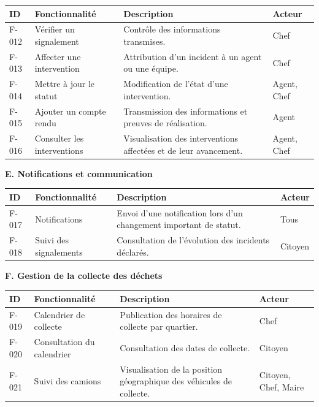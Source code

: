 \documentclass[11pt,a4paper,oneside]{report}
\begin{document}
	\begin{center}
		\begin{tabular}{|p{1.1cm}|p{3cm}|p{8cm}|p{1.7cm}|}
			\hline
			\textbf{ID} & \textbf{Fonctionnalité} &
			\textbf{Description} & \textbf{Acteur} \\ \hline
			F-012 & Vérifier un signalement & Contrôle des informations transmises. & Chef \\ \hline
			F-013 & Affecter une intervention & Attribution d'un incident à un agent ou une équipe. & Chef \\ \hline
			F-014 & Mettre à jour le statut & Modification de l'état d'une intervention. & Agent, Chef \\ \hline
			F-015 & Ajouter un compte rendu & Transmission des informations et preuves de réalisation. & Agent \\ \hline
			F-016 & Consulter les interventions & Visualisation des interventions affectées et de leur avancement. & Agent, Chef \\ \hline
		\end{tabular}
	\end{center}
	
	\noindent\textbf{E. Notifications et communication}
	
	\begin{center}
		\begin{tabular}{|p{1.1cm}|p{3cm}|p{8cm}|p{1.7cm}|}
			\hline
			\textbf{ID} & \textbf{Fonctionnalité} &
			\textbf{Description} & \textbf{Acteur} \\ \hline
			F-017 & Notifications & Envoi d'une notification lors d'un changement important de statut. & Tous \\ \hline
			F-018 & Suivi des signalements & Consultation de l'évolution des incidents déclarés. & Citoyen \\ \hline
		\end{tabular}
	\end{center}
	
	\noindent\textbf{F. Gestion de la collecte des déchets}
	
	\begin{center}
		\begin{tabular}{|p{1.1cm}|p{3cm}|p{8cm}|p{1.7cm}|}
			\hline
			\textbf{ID} & \textbf{Fonctionnalité} &
			\textbf{Description} & \textbf{Acteur} \\ \hline
			F-019 & Calendrier de collecte & Publication des horaires de collecte par quartier. & Chef \\ \hline
			F-020 & Consultation du calendrier & Consultation des dates de collecte. & Citoyen \\ \hline
			F-021 & Suivi des camions & Visualisation de la position géographique des véhicules de collecte. & Citoyen, Chef, Maire \\ \hline
		\end{tabular}
	\end{center}
	
\end{document}
